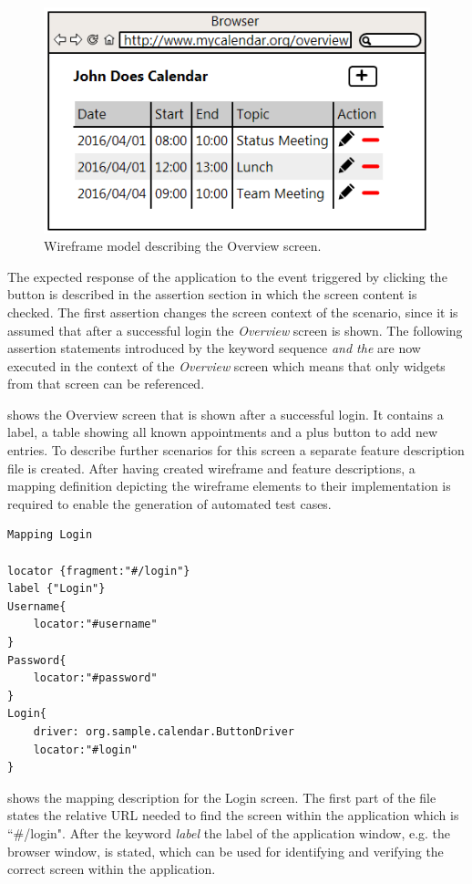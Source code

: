\documentclass{sig-alternate-05-2015}
\begin{document}
\begin{figure}[h]
	\centering
	\includegraphics[width=0.8\linewidth]{Overview.png}
	\caption{Wireframe model describing the Overview screen.}
	\label{fig:overview}
\end{figure}

The expected response of the application to the event triggered by clicking the button is described in the assertion section in which the screen content is checked.
The first assertion changes the screen context of the scenario, since it is assumed that after a successful login the \textit{Overview} screen is shown.
The following assertion statements introduced by the keyword sequence \textit{and the} are now executed in the context of the \textit{Overview} screen which means that only widgets from that screen can be referenced.

 shows the Overview screen that is shown after a successful login.
It contains a label, a table showing all known appointments and a plus button to add new entries.
To describe further scenarios for this screen a separate feature description file is created.
After having created wireframe and feature descriptions, a mapping definition depicting the wireframe elements to their implementation is required to enable the generation of automated test cases.

\begin{lstlisting}[captionpos=b, caption=Mapping Description: Login Screen., label={lst:mappinglogin}, language=dsl]
Mapping Login

locator {fragment:"#/login"}
label {"Login"}
Username{
	locator:"#username"
}
Password{
	locator:"#password"
}
Login{ 
    driver: org.sample.calendar.ButtonDriver
    locator:"#login"
}
\end{lstlisting}

 shows the mapping description for the Login screen.
The first part of the file states the relative URL needed to find the screen within the application which is ``\#/login". 
After the keyword \textit{label} the label of the application window, e.g. the browser window, is stated, which can be used for identifying and verifying the correct screen within the application.
\end{document}
